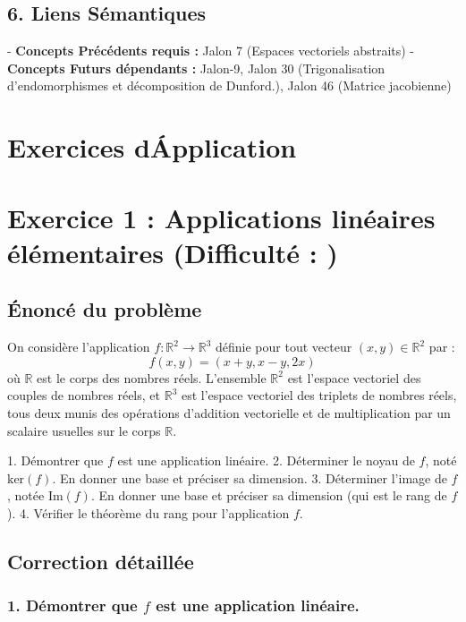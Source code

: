 \documentclass{report}
\begin{document}
\section*{6. Liens Sémantiques}
-   \textbf{Concepts Précédents requis :} Jalon 7 (Espaces vectoriels abstraits)
-   \textbf{Concepts Futurs dépendants :} Jalon-9, Jalon 30 (Trigonalisation d'endomorphismes et décomposition de Dunford.), Jalon 46 (Matrice jacobienne)

\newpage
\chapter*{Exercices d\'Application}
\chapter*{Exercice 1 : Applications linéaires élémentaires (Difficulté : \*)}

\section*{Énoncé du problème}

On considère l'application $f: \mathbb{R}^2 \to \mathbb{R}^3$ définie pour tout vecteur $(x, y) \in \mathbb{R}^2$ par :
$$f(x, y) = (x+y, x-y, 2x)$$
où $\mathbb{R}$ est le corps des nombres réels. L'ensemble $\mathbb{R}^2$ est l'espace vectoriel des couples de nombres réels, et $\mathbb{R}^3$ est l'espace vectoriel des triplets de nombres réels, tous deux munis des opérations d'addition vectorielle et de multiplication par un scalaire usuelles sur le corps $\mathbb{R}$.

1.  Démontrer que $f$ est une application linéaire.
2.  Déterminer le noyau de $f$, noté $\text{ker}(f)$. En donner une base et préciser sa dimension.
3.  Déterminer l'image de $f$, notée $\text{Im}(f)$. En donner une base et préciser sa dimension (qui est le rang de $f$).
4.  Vérifier le théorème du rang pour l'application $f$.

\section*{Correction détaillée}

\subsection*{1. Démontrer que $f$ est une application linéaire.}
\end{document}
